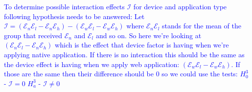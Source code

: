 \textcolor{blue}{ To determine possible interaction effects $\mathcal{I}$ for device and application type following hypothesis needs to be answered: 
Let $\mathcal{I} = (\mathcal{E}_n\mathcal{E}_l - \mathcal{E}_n\mathcal{E}_h)  -  (\mathcal{E}_w\mathcal{E}_l - \mathcal{E}_w\mathcal{E}_h) $  where $\mathcal{E}_n\mathcal{E}_l $ stands for the mean of the group that received $\mathcal{E}_n$ and $\mathcal{E}_l$ and so on. So here we're looking at $(\mathcal{E}_n\mathcal{E}_l - \mathcal{E}_n\mathcal{E}_h)$ which is the effect that device factor is having when we're applying native application. If there is no interaction this should be the same as the device effect is having when we apply web application: $(\mathcal{E}_w\mathcal{E}_l - \mathcal{E}_w\mathcal{E}_h) $. If those are the same then their difference should be 0 so we could use the tests:
\newline $H_0^3$ -  $\mathcal{I} = 0$
\newline $H_a^3$ -  $\mathcal{I} \neq 0$
}